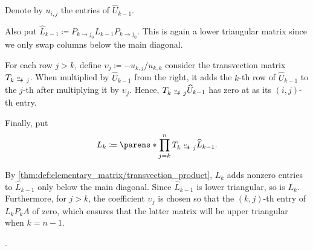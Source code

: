 \begin{algorithm}
\begin{thmenum}
    Denote by \( u_{i,j} \) the entries of \( \widehat{U}_{k-1} \).

    Also put \( \widehat{L}_{k-1} \coloneqq P_{k \to j_0} L_{k-1} P_{k \to j_0} \). This is again a lower triangular matrix since we only swap columns below the main diagonal.

    For each row \( j > k \), define \( \upsilon_j \coloneqq - u_{k,j} / u_{k,k} \) consider the transvection matrix \( T_{k \reloset {\upsilon_j} \to j} \). When multiplied by \( \widehat{U}_{k-1} \) from the right, it adds the \( k \)-th row of \( \widehat{U}_{k-1} \) to the \( j \)-th after multiplying it by \( \upsilon_j \). Hence, \( T_{k \reloset {\upsilon_j} \to j} \widehat{U}_{k-1} \) has zero at as its \( (i, j) \)-th entry.

    Finally, put
    \begin{equation*}
      L_k \coloneqq \parens*{ \prod_{j=k}^n T_{k \reloset {\upsilon_j} \to j} } \widehat{L}_{k-1}.
    \end{equation*}

    By \cref{thm:def:elementary_matrix/transvection_product}, \( L_k \) adds nonzero entries to \( \widehat{L}_{k-1} \) only below the main diagonal. Since \( \widehat{L}_{k-1} \) is lower triangular, so is \( L_k \). Furthermore, for \( j > k \), the coefficient \( \upsilon_j \) is chosen so that the \( (k, j) \)-th entry of \( L_k P_k A \) of zero, which ensures that the latter matrix will be upper triangular when \( k = n - 1 \).
  \end{thmenum}
\end{algorithm}
\begin{comments}
  \item {}
  \item {}
  \item {}.
\end{comments}

